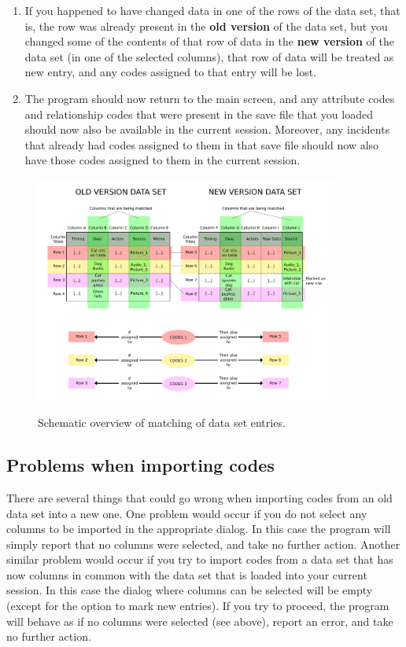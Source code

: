 \documentclass{memoir}
\begin{document}
\begin{enumerate}
\item{If you happened to have changed data in one of the rows of the data set, that is, the row was already present in the \textbf{old version} of the data set, but you changed some of the contents of that row of data in the \textbf{new version} of the data set (in one of the selected columns), that row of data will be treated as new entry, and any codes assigned to that entry will be lost.}
\item{The program should now return to the main screen, and any attribute codes and relationship codes that were present in the save file that you loaded should now also be available in the current session. Moreover, any incidents that already had codes assigned to them in that save file should now also have those codes assigned to them in the current session.}
\end{enumerate}

\begin{figure}[h!]
  \centering
  \caption{Schematic overview of matching of data set entries.}
  \includegraphics[width=100mm]{Diagram_1.pdf}
  \label{fig:importingcodesdiagram}
\end{figure}

\subsection{Problems when importing codes}
\label{sec:problemsimportingcodes}

There are several things that could go wrong when importing codes from an old data set into a new one. One problem would occur if you do not select any columns to be imported in the appropriate dialog. In this case the program will simply report that no columns were selected, and take no further action. Another similar problem would occur if you try to import codes from a data set that has now columns in common with the data set that is loaded into your current session. In this case the dialog where columns can be selected will be empty (except for the option to mark new entries). If you try to proceed, the program will behave as if no columns were selected (see above), report an error, and take no further action.
\end{document}
